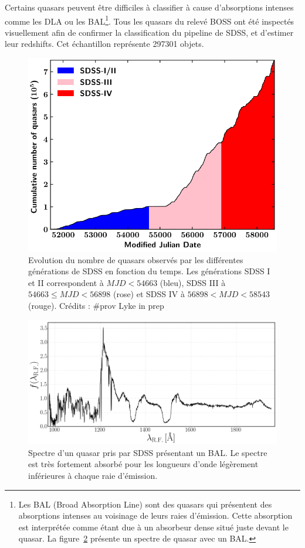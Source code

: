 \documentclass[11pt, twoside, a4paper, openright]{report}
\begin{document}
Certains quasars peuvent être difficiles à classifier à cause d'absorptions intenses comme les DLA ou les BAL\footnote{Les BAL (Broad Absorption Line) sont des quasars qui présentent des absorptions intenses au voisinage de leurs raies d'émission. Cette absorption est interprétée comme étant due à un absorbeur dense situé juste devant le quasar. La figure~\ref{fig:exemple_bal} présente un spectre de quasar avec un BAL.}.
Tous les quasars du relevé BOSS ont été inspectés visuellement \citep{Paris2016} afin de confirmer la classification du pipeline de SDSS, et d'estimer leur redshifts. Cet échantillon représente \num{297301} objets.
\begin{figure}
  \centering
  \includegraphics[scale=0.35]{quasar_number}
  \caption{Evolution du nombre de quasars observés par les différentes générations de SDSS en fonction du temps. Les générations SDSS I et II correspondent à $MJD < 54663$ (bleu), SDSS III à $54663 \leq MJD < 56898$ (rose) et SDSS IV à $56898 < MJD < 58543$ (rouge). Crédits : \#prov Lyke in prep}
  \label{fig:quasar_number}
\end{figure}
\begin{figure}
  \centering
  \includegraphics[scale=0.4]{exemple_bal}
  \caption{Spectre d'un quasar pris par SDSS présentant un BAL. Le spectre est très fortement absorbé pour les longueurs d'onde légèrement inférieures à chaque raie d'émission.}
  \label{fig:exemple_bal}
\end{figure}
\end{document}
